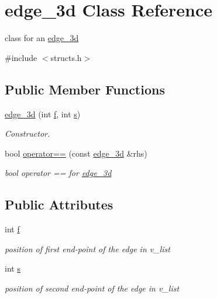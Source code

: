 \hypertarget{classedge__3d}{}\section{edge\+\_\+3d Class Reference}
\label{classedge__3d}


class for an \hyperlink{classedge__3d}{edge\+\_\+3d}  




{\ttfamily \#include $<$structs.\+h$>$}

\subsection*{Public Member Functions}
\begin{DoxyCompactItemize}
\item 
\hyperlink{classedge__3d_afac87fcbf6f852908b7113dc2efe59d9}{edge\+\_\+3d} (int \hyperlink{classedge__3d_a1365e6035d117feb008f996290507425}{f}, int \hyperlink{classedge__3d_aa33edd90f3962b3caf4dd8780d3fd9fb}{s})
\begin{DoxyCompactList}\small\item\em Constructor. \end{DoxyCompactList}\item 
bool \hyperlink{classedge__3d_ac01ef82b4f0003f7b1bc84f47ac89e9c}{operator==} (const \hyperlink{classedge__3d}{edge\+\_\+3d} \&rhs)
\begin{DoxyCompactList}\small\item\em bool operator == for \hyperlink{classedge__3d}{edge\+\_\+3d} \end{DoxyCompactList}\end{DoxyCompactItemize}
\subsection*{Public Attributes}
\begin{DoxyCompactItemize}
\item 
int \hyperlink{classedge__3d_a1365e6035d117feb008f996290507425}{f}
\begin{DoxyCompactList}\small\item\em position of first end-\/point of the edge in v\+\_\+list \end{DoxyCompactList}\item 
int \hyperlink{classedge__3d_aa33edd90f3962b3caf4dd8780d3fd9fb}{s}
\begin{DoxyCompactList}\small\item\em position of second end-\/point of the edge in v\+\_\+list \end{DoxyCompactList}\end{DoxyCompactItemize}



